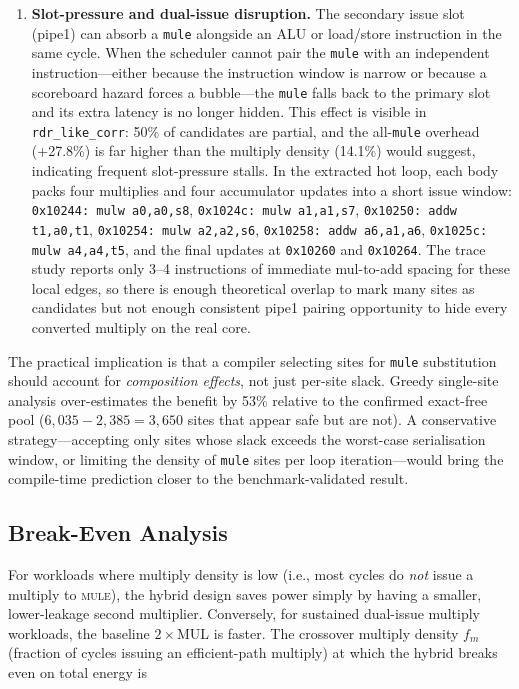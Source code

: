 \begin{enumerate}
  \item \textbf{Slot-pressure and dual-issue disruption.}  The
  secondary issue slot (pipe1) can absorb a \texttt{mule} alongside an
  ALU or load/store instruction in the same cycle.  When the scheduler
  cannot pair the \texttt{mule} with an independent instruction---either
  because the instruction window is narrow or because a scoreboard
  hazard forces a bubble---the \texttt{mule} falls back to the primary
  slot and its extra latency is no longer hidden.  This effect is
  visible in \texttt{rdr\_like\_corr}: 50\% of candidates are partial,
  and the all-\texttt{mule} overhead (+27.8\%) is far higher than the
  multiply density (14.1\%) would suggest, indicating frequent
  slot-pressure stalls.  In the extracted hot loop, each body packs four
  multiplies and four accumulator updates into a short issue window:
  \texttt{0x10244: mulw a0,a0,s8}, \texttt{0x1024c: mulw a1,a1,s7},
  \texttt{0x10250: addw t1,a0,t1}, \texttt{0x10254: mulw a2,a2,s6},
  \texttt{0x10258: addw a6,a1,a6}, \texttt{0x1025c: mulw a4,a4,t5}, and
  the final updates at \texttt{0x10260} and \texttt{0x10264}.  The trace
  study reports only 3--4 instructions of immediate mul-to-add spacing
  for these local edges, so there is enough theoretical overlap to mark
  many sites as candidates but not enough consistent pipe1 pairing
  opportunity to hide every converted multiply on the real core.
\end{enumerate}

The practical implication is that a compiler selecting sites for
\texttt{mule} substitution should account for \emph{composition
effects}, not just per-site slack.  Greedy single-site analysis
over-estimates the benefit by 53\% relative to the confirmed
exact-free pool ($6{,}035 - 2{,}385 = 3{,}650$ sites that appear safe
but are not).  A conservative strategy---accepting only sites whose
slack exceeds the worst-case serialisation window, or limiting the
density of \texttt{mule} sites per loop iteration---would bring the
compile-time prediction closer to the benchmark-validated result.

\subsection{Break-Even Analysis}\label{sec:eval:breakeven}

For workloads where multiply density is low (i.e., most cycles do
\emph{not} issue a multiply to \textsc{mule}), the hybrid design saves
power simply by having a smaller, lower-leakage second multiplier.
Conversely, for sustained dual-issue multiply workloads, the baseline
$2\!\times\!$MUL is faster. The crossover multiply density $f_m$
(fraction of cycles issuing an efficient-path multiply) at which the hybrid
breaks even on total energy is

